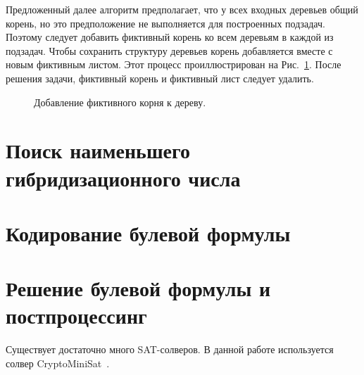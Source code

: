 Предложенный далее алгоритм предполагает, что у всех входных деревьев общий корень, но это предположение не выполняется для построенных подзадач.
Поэтому следует добавить фиктивный корень ко всем деревьям в каждой из подзадач.
Чтобы сохранить структуру деревьев корень добавляется вместе с новым фиктивным листом.
Этот процесс проиллюстрирован на Рис.~\ref{dummy-example}.
После решения задачи, фиктивный корень и фиктивный лист следует удалить.

\begin{figure}[t]
  \begin{minipage}[b]{0.49\linewidth}
  \end{minipage}
  \hfill
  \begin{minipage}[b]{0.49\linewidth}
  \end{minipage}
  \caption{Добавление фиктивного корня к дереву.}
  \label{dummy-example}
\end{figure}

\FloatBarrier
\section{Поиск наименьшего гибридизационного числа}



\FloatBarrier
\section{Кодирование булевой формулы}

\FloatBarrier
\section{Решение булевой формулы и постпроцессинг}

Существует достаточно много SAT-солверов. В данной работе используется солвер CryptoMiniSat~\cite{cryptominisat}.